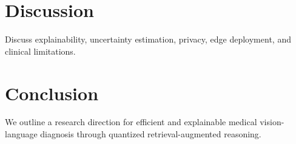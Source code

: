 \documentclass[conference]{IEEEtran}
\begin{document}
\section{Discussion}
Discuss explainability, uncertainty estimation, privacy, edge deployment, and clinical limitations.

\section{Conclusion}
We outline a research direction for efficient and explainable medical vision-language diagnosis through quantized retrieval-augmented reasoning.

\nocite{*}


\end{document}
